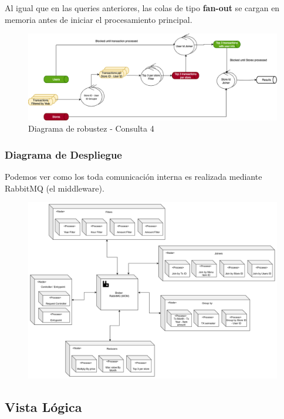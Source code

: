 \documentclass[titlepage,a4paper]{article}
\begin{document}
Al igual que en las queries anteriores, las colas de tipo \textbf{fan-out} se cargan en memoria antes de iniciar el procesamiento principal.


\begin{figure}[H]
    \centering
    \includegraphics[width=1.0\textwidth]{consulta4.png}
    \caption{Diagrama de robustez - Consulta 4}
\end{figure}

\subsubsection{Diagrama de Despliegue}

Podemos ver como los toda comunicación interna es realizada mediante RabbitMQ (el middleware).

\begin{figure}[H]
    \centering
    \includegraphics[width=1\linewidth]{despliegue.png}
\end{figure}


\subsection{Vista Lógica}
\end{document}
